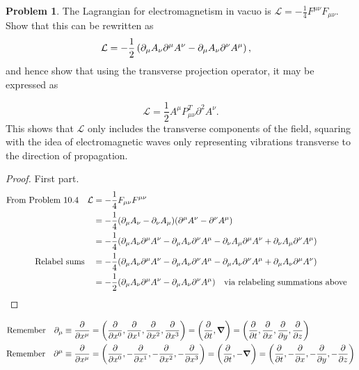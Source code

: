 \documentclass[letterpaper]{article}
\theoremstyle{definition}
\newtheorem{prob}{Problem}[section]
\begin{document}
\begin{prob}
  The Lagrangian for electromagnetism in vacuo is $\mathcal{L}=-\frac{1}{4}F^{\mu\nu}F_{\mu\nu}$. Show that this can be rewritten as
  \[\mathcal{L}=-\frac{1}{2}\left(\partial_\mu A_\nu\partial^\mu A^\nu-\partial_\mu A_\nu\partial^\nu A^\mu\right)\qcomma\]
  and hence show that using the transverse projection operator, it may be expressed as

  \[\mathcal{L}=\frac{1}{2}A^\mu P^T_{\mu\nu}\partial^2A^\nu.\]
  This shows that $\mathcal{L}$ only includes the transverse components of the field, squaring with the idea of electromagnetic waves only representing vibrations transverse to the direction of propagation.
\end{prob}

\begin{proof}First part.
  \begin{align*}
    \qq*{From Problem 10.4}\mathcal{L} & =-\frac{1}{4}F_{\mu\nu}F^{\mu\nu}                                                                                                                                              \\
                                       & =-\frac{1}{4}\pqty{\partial_\mu A_\nu - \partial_\nu A_\mu}\pqty{\partial^\mu A^\nu-\partial^\nu A^\mu}                                                                        \\
                                       & =-\frac{1}{4}\pqty{\partial_\mu A_\nu \partial^\mu A^\nu -\partial_\mu A_\nu \partial^\nu A^\mu - \partial_\nu A_\mu \partial^\mu A^\nu+\partial_\nu A_\mu \partial^\nu A^\mu} \\
    \qq*{Relabel sums}                 & =-\frac{1}{4}\pqty{\partial_\mu A_\nu \partial^\mu A^\nu -\partial_\mu A_\nu \partial^\nu A^\mu - \partial_\mu A_\nu \partial^\nu A^\mu+\partial_\mu A_\nu \partial^\mu A^\nu} \\
                                       & =-\frac{1}{2}\pqty{\partial_\mu A_\nu \partial^\mu A^\nu -\partial_\mu A_\nu \partial^\nu A^\mu} \qq{via relabeling summations above}                                          \\
  \end{align*}
\end{proof}
\begin{align*}
  \qq*{Remember}\partial_\mu\equiv\pdv{x^\mu} & =\pqty{\pdv{x^0},\pdv{x^1},\pdv{x^2},\pdv{x^3}}=\pqty{\pdv{t},\grad}=\pqty{\pdv{t},\pdv{x},\pdv{y},\pdv{z}}        \\
  \qq*{Remember}\partial^\mu\equiv\pdv{x^\mu} & =\pqty{\pdv{x^0},-\pdv{x^1},-\pdv{x^2},-\pdv{x^3}}=\pqty{\pdv{t},-\grad}=\pqty{\pdv{t},-\pdv{x},-\pdv{y},-\pdv{z}} \\
\end{align*}
\end{document}
